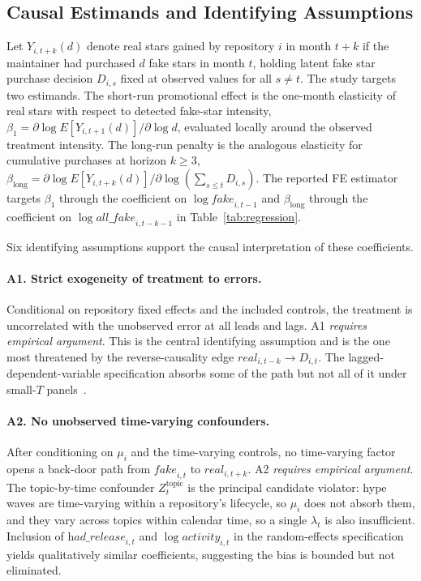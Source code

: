 \subsection{Causal Estimands and Identifying Assumptions}
\label{sec:fake-stars-credibility-estimand}

Let $Y_{i, t+k}(d)$ denote real stars gained by repository $i$ in month $t+k$ if the maintainer had purchased $d$ fake stars in month $t$, holding latent fake star purchase decision $D_{i, s}$ fixed at observed values for all $s \neq t$.
The study targets two estimands.
The short-run promotional effect is the one-month elasticity of real stars with respect to detected fake-star intensity, $\beta_1 = \partial \log E[Y_{i, t+1}(d)] / \partial \log d$, evaluated locally around the observed treatment intensity.
The long-run penalty is the analogous elasticity for cumulative purchases at horizon $k \geq 3$, $\beta_{\text{long}} = \partial \log E[Y_{i, t+k}(d)] / \partial \log\!\left(\sum_{s \leq t} D_{i,s}\right)$.
The reported FE estimator targets $\beta_1$ through the coefficient on $\log \textit{fake}_{i, t-1}$ and $\beta_{\text{long}}$ through the coefficient on $\log \textit{all\_fake}_{i, t-k-1}$ in Table~\ref{tab:regression}.

Six identifying assumptions support the causal interpretation of these coefficients.

\paragraph{A1. Strict exogeneity of treatment to errors.}
Conditional on repository fixed effects and the included controls, the treatment is uncorrelated with the unobserved error at all leads and lags.
A1 \emph{requires empirical argument}.
This is the central identifying assumption and is the one most threatened by the reverse-causality edge $\textit{real}_{i, t-k} \to D_{i,t}$.
The lagged-dependent-variable specification absorbs some of the path but not all of it under small-$T$ panels~\cite{nickell1981biases}.

\paragraph{A2. No unobserved time-varying confounders.}
After conditioning on $\mu_i$ and the time-varying controls, no time-varying factor opens a back-door path from $\textit{fake}_{i,t}$ to $\textit{real}_{i, t+k}$.
A2 \emph{requires empirical argument}.
The topic-by-time confounder $Z_{t}^{\text{topic}}$ is the principal candidate violator: hype waves are time-varying within a repository's lifecycle, so $\mu_i$ does not absorb them, and they vary across topics within calendar time, so a single $\lambda_t$ is also insufficient.
Inclusion of $\textit{had\_release}_{i,t}$ and $\log\textit{activity}_{i,t}$ in the random-effects specification yields qualitatively similar coefficients, suggesting the bias is bounded but not eliminated.

